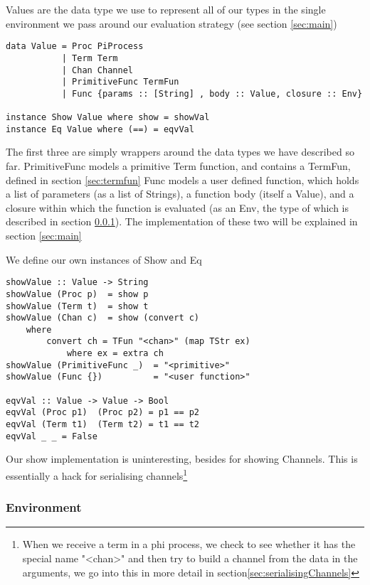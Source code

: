 \begin{description}
Values are the data type we use to represent all of our types in the single environment we pass around our evaluation strategy (see section \ref{sec:main})

\begin{verbatim}
data Value = Proc PiProcess 
           | Term Term
           | Chan Channel
           | PrimitiveFunc TermFun
           | Func {params :: [String] , body :: Value, closure :: Env}

instance Show Value where show = showVal
instance Eq Value where (==) = eqvVal
\end{verbatim}

The first three are simply wrappers around the data types we have described so far.
PrimitiveFunc models a primitive Term function, and contains a TermFun, defined in section \ref{sec:termfun}
Func models a user defined function, which holds a list of parameters (as a list of Strings), a function body (itself a Value), and a closure within which the function is evaluated (as an Env, the type of which is described in section \ref{sec:environment}). The implementation of these two will be explained in section \ref{sec:main}

We define our own instances of Show and Eq

\begin{verbatim}
showValue :: Value -> String
showValue (Proc p)  = show p
showValue (Term t)  = show t
showValue (Chan c)  = show (convert c)
    where 
        convert ch = TFun "<chan>" (map TStr ex) 
            where ex = extra ch
showValue (PrimitiveFunc _)  = "<primitive>" 
showValue (Func {})          = "<user function>"  

eqvVal :: Value -> Value -> Bool
eqvVal (Proc p1)  (Proc p2) = p1 == p2
eqvVal (Term t1)  (Term t2) = t1 == t2
eqvVal _ _ = False
\end{verbatim}

Our show implementation is uninteresting, besides for showing Channels. This is essentially a hack for serialising channels\footnote{When we receive a term in a phi process, we check to see whether it has the special name "<chan>" and then try to build a channel from the data in the arguments, we go into this in more detail in section\ref{sec:serialisingChannels}}

\subsubsection{Environment}
\label{sec:environment}



\end{description}
